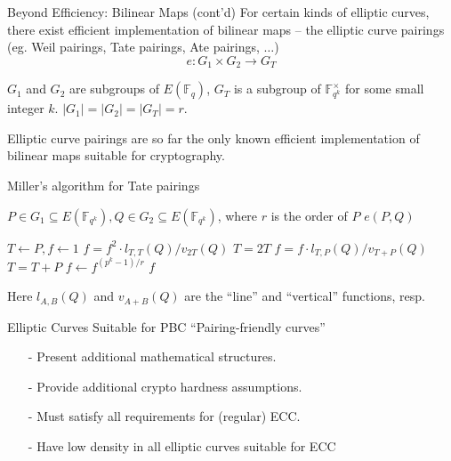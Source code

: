 \documentclass{beamer}
\begin{document}
%
%


\begin{frame}{Beyond Efficiency: Bilinear Maps (cont'd)}
For certain kinds of elliptic curves, there exist efficient implementation
of bilinear maps -- the elliptic curve pairings (eg. Weil pairings, 
Tate pairings, Ate pairings, $\ldots$)
$$e: G_1 \times G_2 \rightarrow G_T$$

$G_1$ and $G_2$ are subgroups of $E(\mathbb{F}_q)$, $G_T$ is a subgroup of 
$\mathbb{F}_{q^k}^{\times}$ for some small integer $k$. 
$|G_1| = |G_2| = |G_T| = r$.

\begin{block}{}
Elliptic curve pairings are so far the only known efficient implementation
of bilinear maps suitable for cryptography.
\end{block}
\end{frame}

\begin{frame}{Miller's algorithm for Tate pairings}

{\footnotesize
\begin{algorithm}[H]
\caption{Basic Miller's algorithm}
\begin{algorithmic}[1] %
\REQUIRE $P\in G_1 \subseteq E(\mathbb{F}_{q^k}), Q\in G_2 \subseteq 
E(\mathbb{F}_{q^k})$, where $r$ is the order of $P$
\ENSURE $e(P, Q)$

\STATE $T\leftarrow P, f\leftarrow 1$
\STATE $f = f^2\cdot l_{T, T}(Q)/v_{2T}(Q)$
\STATE $T = 2T$
 \STATE $f = f\cdot l_{T, P}(Q)/v_{T+P}(Q)$
 \STATE $T = T + P$
\ENDIF
\ENDFOR
\STATE $f\leftarrow f^{(p^k - 1)/r}$
%
\RETURN $f$
\end{algorithmic}
\end{algorithm}
Here $l_{A, B}(Q)$ and $v_{A+B}(Q)$ are the ``line'' and ``vertical'' functions,
resp.
}
\end{frame}

\begin{frame}{Elliptic Curves Suitable for PBC}
``Pairing-friendly curves''
\begin{itemize}
\item[-] Present additional mathematical structures.
\item[-] Provide additional crypto hardness assumptions.
\item[-] Must satisfy all requirements for (regular) ECC.
\item[-] Have low density in all elliptic curves suitable for ECC
\end{itemize}
\end{frame}
\end{document}
